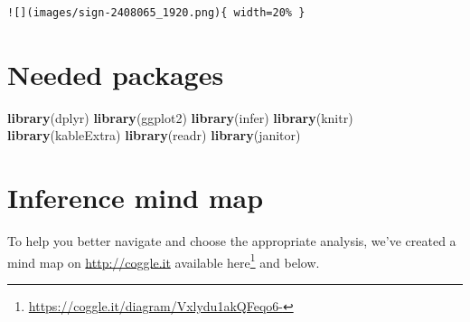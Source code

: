 \documentclass[12pt, krantz2,]{krantz}
\makeatletter
\newenvironment{Shaded}{\begin{snugshade}}{\end{snugshade}}
\newcommand{\DataTypeTok}[1]{\textcolor[rgb]{0.27,0.27,0.27}{#1}}
\newcommand{\KeywordTok}[1]{\textcolor[rgb]{0.27,0.27,0.27}{\textbf{#1}}}
\newcommand{\NormalTok}[1]{#1}
\newcommand{\StringTok}[1]{\textcolor[rgb]{0.5,0.5,0.5}{#1}}
\renewcommand{\href}[2]{#2\footnote{\url{#1}}}
\newenvironment{kframe}{%
\medskip{}
\setlength{\fboxsep}{.8em}
 \def\at@end@of@kframe{}%
 \ifinner\ifhmode%
  \def\at@end@of@kframe{\end{minipage}}%
  \begin{minipage}{\columnwidth}%
 \fi\fi%
 \def\FrameCommand##1{\hskip\@totalleftmargin \hskip-\fboxsep
 \colorbox{shadecolor}{##1}\hskip-\fboxsep
     \hskip-\linewidth \hskip-\@totalleftmargin \hskip\columnwidth}%
 \MakeFramed {\advance\hsize-\width
   \@totalleftmargin\z@ \linewidth\hsize
   \@setminipage}}%
 {\par\unskip\endMakeFramed%
 \at@end@of@kframe}
\renewenvironment{Shaded}{\begin{kframe}}{\end{kframe}}
\makeatother
\begin{document}
\begin{Shaded}
\end{Shaded}

\begin{verbatim}
![](images/sign-2408065_1920.png){ width=20% }
\end{verbatim}

\hypertarget{needed-packages-11}{%
\section*{Needed packages}\label{needed-packages-11}}


\begin{Shaded}
\begin{Highlighting}[]
\KeywordTok{library}\NormalTok{(dplyr)}
\KeywordTok{library}\NormalTok{(ggplot2)}
\KeywordTok{library}\NormalTok{(infer)}
\KeywordTok{library}\NormalTok{(knitr)}
\KeywordTok{library}\NormalTok{(kableExtra)}
\KeywordTok{library}\NormalTok{(readr)}
\KeywordTok{library}\NormalTok{(janitor)}
\end{Highlighting}
\end{Shaded}

\hypertarget{inference-mind-map}{%
\section{Inference mind map}\label{inference-mind-map}}

To help you better navigate and choose the appropriate analysis, we've created a mind map on \url{http://coggle.it} available \href{https://coggle.it/diagram/Vxlydu1akQFeqo6-}{here} and below.
\end{document}
